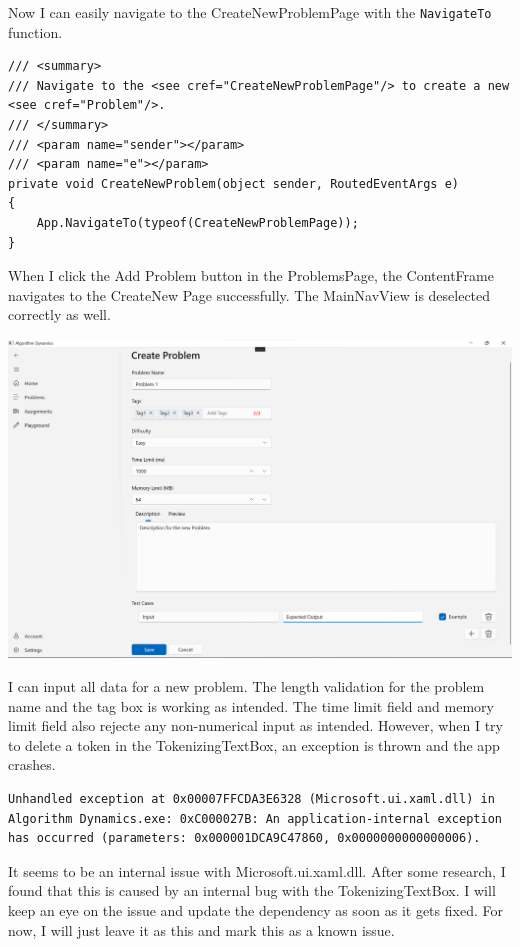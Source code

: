 \documentclass[a4paper]{report}
\newcommand{\code}{\texttt}
\begin{document}
Now I can easily navigate to the CreateNewProblemPage with the \code{NavigateTo} function.

\begin{verbatim}
/// <summary>
/// Navigate to the <see cref="CreateNewProblemPage"/> to create a new <see cref="Problem"/>.
/// </summary>
/// <param name="sender"></param>
/// <param name="e"></param>
private void CreateNewProblem(object sender, RoutedEventArgs e)
{
    App.NavigateTo(typeof(CreateNewProblemPage));
}
\end{verbatim}

When I click the Add Problem button in the ProblemsPage, the ContentFrame navigates to the CreateNew Page successfully. The MainNavView is deselected correctly as well.

\includegraphics[width=\textwidth, height=\textheight, keepaspectratio]{CreateNewProblemPage-Layout}

I can input all data for a new problem. The length validation for the problem name and the tag box is working as intended. The time limit field and memory limit field also rejecte any non-numerical input as intended. However, when I try to delete a token in the TokenizingTextBox, an exception is thrown and the app crashes.

\begin{verbatim}
Unhandled exception at 0x00007FFCDA3E6328 (Microsoft.ui.xaml.dll) in Algorithm Dynamics.exe: 0xC000027B: An application-internal exception has occurred (parameters: 0x000001DCA9C47860, 0x0000000000000006).
\end{verbatim}

It seems to be an internal issue with Microsoft.ui.xaml.dll. After some research, I found that this is caused by an internal bug with the TokenizingTextBox\cite{github:WindowsCommunityToolkit:4437}. I will keep an eye on the issue and update the dependency as soon as it gets fixed. For now, I will just leave it as this and mark this as a known issue.
\end{document}
